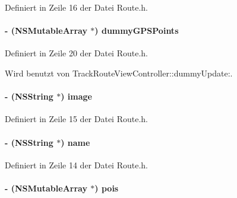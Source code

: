 Definiert in Zeile 16 der Datei Route.h.\hypertarget{interface_route_ad8a3b460a65086d981a3ca43e7afe094}{
\paragraph[{dummyGPSPoints}]{\setlength{\rightskip}{0pt plus 5cm}-\/ (NSMutableArray $\ast$) dummyGPSPoints}\hfill}
\label{interface_route_ad8a3b460a65086d981a3ca43e7afe094}


Definiert in Zeile 20 der Datei Route.h.

Wird benutzt von TrackRouteViewController::dummyUpdate:.\hypertarget{interface_route_a461ded6f64d5b7da83e9aaa31c4f31c6}{
\paragraph[{image}]{\setlength{\rightskip}{0pt plus 5cm}-\/ (NSString $\ast$) image}\hfill}
\label{interface_route_a461ded6f64d5b7da83e9aaa31c4f31c6}


Definiert in Zeile 15 der Datei Route.h.\hypertarget{interface_route_a3634bcbb7277dd09256f85b8ac708e69}{
\paragraph[{name}]{\setlength{\rightskip}{0pt plus 5cm}-\/ (NSString $\ast$) name}\hfill}
\label{interface_route_a3634bcbb7277dd09256f85b8ac708e69}


Definiert in Zeile 14 der Datei Route.h.\hypertarget{interface_route_a0e0471c4dc01c66a7e412e390bce7571}{
\paragraph[{pois}]{\setlength{\rightskip}{0pt plus 5cm}-\/ (NSMutableArray $\ast$) pois}\hfill}
\label{interface_route_a0e0471c4dc01c66a7e412e390bce7571}


